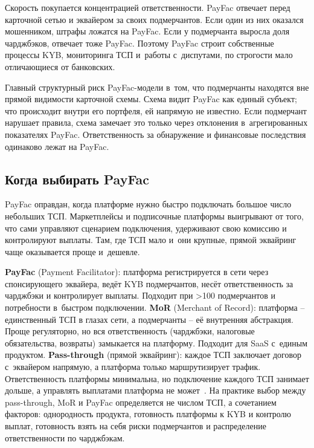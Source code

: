 Скорость покупается концентрацией ответственности. PayFac отвечает
перед карточной сетью и эквайером за своих подмерчантов. Если один
из них оказался мошенником, штрафы ложатся на PayFac. Если у
подмерчанта выросла доля чарджбэков, отвечает тоже PayFac. Поэтому
PayFac строит собственные процессы KYB, мониторинга ТСП и~работы
с~диспутами, по строгости мало отличающиеся от
банковских.~\cite{visa-acceptance-entities,visa-payment-facilitator-marketplace-risk-guide}

Главный структурный риск PayFac-модели в~том, что подмерчанты
находятся вне прямой видимости карточной схемы. Схема видит PayFac
как единый субъект; что происходит внутри его портфеля, ей напрямую
не известно. Если подмерчант нарушает правила, схема замечает это
только через отклонения в~агрегированных показателях PayFac.
Ответственность за обнаружение и финансовые последствия одинаково
лежат на PayFac.

\subsection*{Когда выбирать PayFac}

PayFac оправдан, когда платформе нужно быстро подключать большое
число небольших ТСП. Маркетплейсы и подписочные платформы выигрывают
от того, что сами управляют сценарием подключения, удерживают свою
комиссию и контролируют выплаты. Там, где ТСП мало и~они крупные,
прямой эквайринг чаще оказывается проще и~дешевле.

\textbf{PayFac} (Payment Facilitator): платформа регистрируется в
сети через спонсирующего эквайера, ведёт KYB подмерчантов, несёт
ответственность за чарджбэки и контролирует выплаты. Подходит при
>100 подмерчантов и потребности в~быстром подключении.
\textbf{MoR} (Merchant of Record): платформа -- единственный ТСП в
глазах сети, а подмерчанты -- её внутренняя абстракция. Проще
регуляторно, но вся ответственность (чарджбэки, налоговые
обязательства, возвраты) замыкается на платформу. Подходит для SaaS
с~единым продуктом. \textbf{Pass-through} (прямой эквайринг): каждое
ТСП заключает договор с~эквайером напрямую, а платформа только
маршрутизирует трафик. Ответственность платформы минимальна, но
подключение каждого ТСП занимает дольше, а управлять выплатами
платформа не
может~\cite{visa-acceptance-entities}. На практике выбор между
pass-through, MoR и PayFac определяется не числом ТСП, а сочетанием
факторов: однородность продукта, готовность платформы к KYB и
контролю выплат, готовность взять на себя риски подмерчантов и
распределение ответственности по чарджбэкам.

